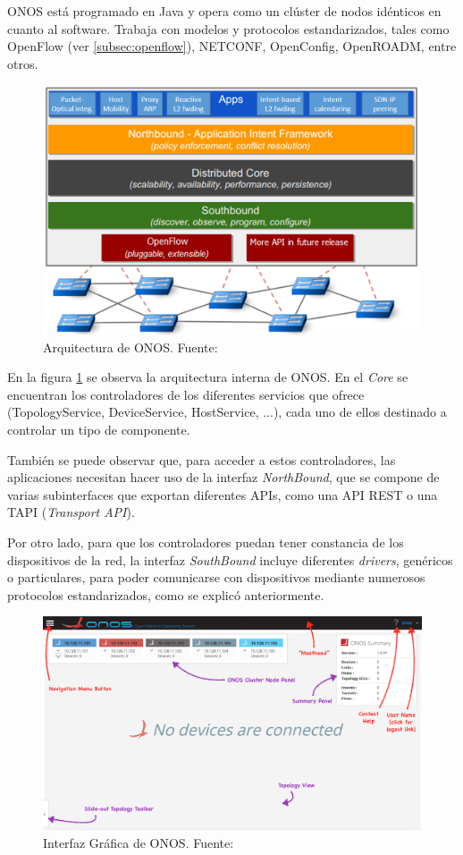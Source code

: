 ONOS está programado en Java y opera como un clúster de nodos idénticos en cuanto al software. Trabaja con modelos y protocolos estandarizados, tales como OpenFlow (ver \ref{subsec:openflow}), NETCONF, OpenConfig, OpenROADM, entre otros.

\clearpage


\begin{figure}[!ht]
	\centering
	\includegraphics[width=0.7\linewidth]{imagenes/onos_architecture}
	\caption{Arquitectura de ONOS. 
		Fuente: \cite{onostutbib}}
	\label{fig:onosarch}
\end{figure}

En la figura \ref{fig:onosarch} se observa la arquitectura interna de ONOS. En el \textit{Core} se encuentran los controladores de los diferentes servicios que ofrece (TopologyService, DeviceService, HostService, ...), cada uno de ellos destinado a controlar un tipo de componente.

También se puede observar que, para acceder a estos controladores, las aplicaciones necesitan hacer uso de la interfaz \textit{NorthBound}, que se compone de varias subinterfaces que exportan diferentes APIs, como una API REST o una TAPI (\textit{Transport API}).

Por otro lado, para que los controladores puedan tener constancia de los dispositivos de la red, la interfaz \textit{SouthBound} incluye diferentes \textit{drivers}, genéricos o particulares, para poder comunicarse con dispositivos mediante numerosos protocolos estandarizados, como se explicó anteriormente.

\begin{figure}[!ht]
	\centering
	\includegraphics[width=0.8\linewidth]{imagenes/onos_gui}
	\caption{Interfaz Gráfica de ONOS. 
		Fuente: \cite{wikionosbib}}
	\label{fig:onosgui}
\end{figure}

